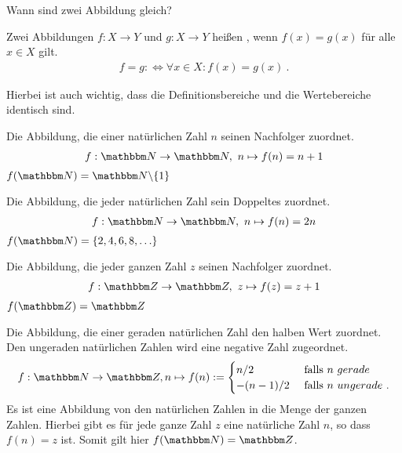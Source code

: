 \begin{Unit}
Wann sind zwei Abbildung gleich?

\begin{Definition}
Zwei Abbildungen $f: X \rightarrow Y$ und $g: X \rightarrow Y$ heißen
, wenn $f(x) = g(x)$ für alle $x \in X$ gilt.
\begin{align}
   f = g :\Leftrightarrow \forall x \in X: f(x) = g(x) \ .
\end{align}
\end{Definition}

Hierbei ist auch wichtig, dass die Definitionsbereiche und die Wertebereiche
identisch sind.
\end{Unit} 

\begin{Unit}[Beispiel] 
Die Abbildung, die einer natürlichen Zahl $n$ seinen Nachfolger zuordnet.
\begin{align}
  f: \NN \rightarrow \NN,\ n \mapsto f(n) = n + 1
\end{align}
$f(\NN) = \NN \backslash \{1\}$
\end{Unit}

\begin{Unit}[Beispiel] 
Die Abbildung, die jeder natürlichen Zahl sein Doppeltes zuordnet.
\begin{align}
  f: \NN \rightarrow \NN,\ n \mapsto f(n) = 2n
\end{align}
$f(\NN) = \{2, 4, 6, 8, \ldots \}$
\end{Unit}

\begin{Unit}[Beispiel] 
Die Abbildung, die jeder ganzen Zahl $z$ seinen Nachfolger zuordnet.
\begin{align}
  f: \ZZ \rightarrow \ZZ,\ z \mapsto f(z) = z + 1
\end{align}
$f(\ZZ) = \ZZ$
\end{Unit}

\begin{Unit}[Beispiel] 
Die Abbildung, die einer geraden natürlichen Zahl den halben Wert zuordnet.
Den ungeraden natürlichen Zahlen wird eine negative Zahl zugeordnet.
\begin{align}
  f: \NN \rightarrow \ZZ, n \mapsto f(n) := 
  \begin{cases} 
    n/2      & \text{ falls }n{\ gerade } \\ 
    -(n-1)/2 & \text{ falls }n{\ ungerade } \ .
  \end{cases}
\end{align}
Es ist eine Abbildung von den natürlichen Zahlen in die Menge der ganzen 
Zahlen. Hierbei gibt es für jede ganze Zahl $z$ eine natürliche Zahl $n$, so
dass $f(n) = z$ ist. Somit gilt hier $f(\NN) = \ZZ$.
\end{Unit}

